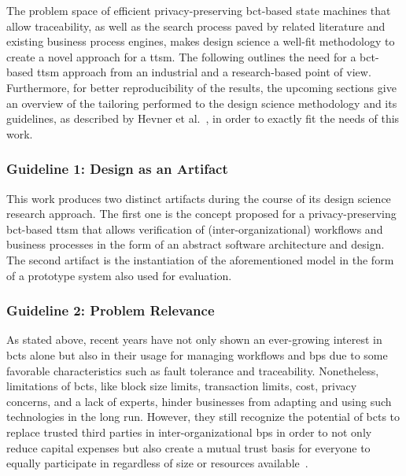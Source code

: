 The problem space of efficient privacy-preserving \gls{bct}-based state machines that allow traceability, as well as the search process paved by related literature and existing business process engines, makes design science a well-fit methodology to create a novel approach for a \gls{ttsm}. The following outlines the need for a \gls{bct}-based \gls{ttsm} approach from an industrial and a research-based point of view. Furthermore, for better reproducibility of the results, the upcoming sections give an overview of the tailoring performed to the design science methodology and its guidelines, as described by Hevner et al.~\cite{hevner2004_design_science}, in order to exactly fit the needs of this work.

\subsubsection{Guideline 1: Design as an Artifact}
\label{sec:ttsm:methodology:gl1}
This work produces two distinct artifacts during the course of its design science research approach. The first one is the concept proposed for a privacy-preserving \gls{bct}-based \gls{ttsm} that allows verification of (inter-organizational) workflows and business processes in the form of an abstract software architecture and design. The second artifact is the instantiation of the aforementioned model in the form of a prototype system also used for evaluation.

\subsubsection{Guideline 2: Problem Relevance}
\label{sec:ttsm:methodology:gl2}
As stated above, recent years have not only shown an ever-growing interest in \glspl{bct} alone but also in their usage for managing workflows and \glspl{bp} due to some favorable characteristics such as fault tolerance and traceability. Nonetheless, limitations of \glspl{bct}, like block size limits, transaction limits, cost, privacy concerns, and a lack of experts, hinder businesses from adapting and using such technologies in the long run. However, they still recognize the potential of \glspl{bct} to replace trusted third parties in inter-organizational \glspl{bp} in order to not only reduce capital expenses but also create a mutual trust basis for everyone to equally participate in regardless of size or resources available~\cite{blockchains_for_bpmn_challenges_and_opportunities,blockchain_and_iot_for_bpm,impact_of_trust_on_supply_chains,untrusted_bp_execution_using_blockchain,public_chains_make_private_chains_obsolete,baseline_spec}.

